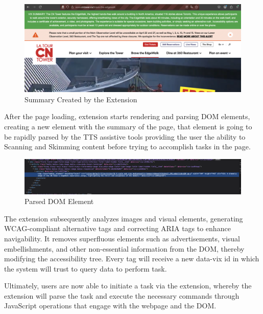 \documentclass[conference]{IEEEtran}
\begin{document}
\begin{figure}[h]
\centerline{\includegraphics[width=\linewidth]{images/3.png}}
\caption{Summary Created by the Extension}
\label{fig2}
\end{figure}

After the page loading, extension starts rendering and parsing DOM elements, creating a new element with the summary of the page, that element is going to be rapidly parsed by the TTS assistive tools providing the user the ability to Scanning and Skimming content before trying to accomplish tasks in the page.

\begin{figure}[h]
\centerline{\includegraphics[width=\linewidth]{images/4.png}}
\caption{Parsed DOM Element}
\label{fig2}
\end{figure}

The extension subsequently analyzes images and visual elements, generating WCAG-compliant alternative tags and correcting ARIA tags to enhance navigability. It removes superfluous elements such as advertisements, visual embellishments, and other non-essential information from the DOM, thereby modifying the accessibility tree. Every tag will receive a new data-vix id in which the system will trust to query data to perform task.

Ultimately, users are now able to initiate a task via the extension, whereby the extension will parse the task and execute the necessary commands through JavaScript operations that engage with the webpage and the DOM.
\end{document}
